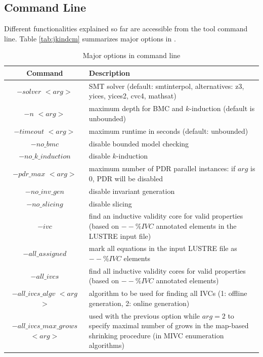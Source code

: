 \subsection{Command Line}
Different \jkind functionalities explained so far are accessible from the tool command line. Table \ref{tab:jkindcm} summarizes major options in \jkind.

\begin{table}
  \caption{Major options in \jkind command line}
   \vspace{-0.1in}
  \centering
\begin{tabularx}{\linewidth}{|c|L|}
\hline
    Command & Description\\
  \hline\hline
  $-solver $ $<$$arg$$>$ & SMT solver (default: smtinterpol, alternatives: z3, yices, yices2, cvc4, mathsat)\\[0.5ex]\hline
  $-n $ $<$$arg$$>$  & maximum depth for BMC and $k$-induction (default is unbounded) \\[0.5ex]
  $-timeout $ $<$$arg$$>$ & maximum runtime in seconds (default: unbounded)\\[0.5ex]\hline
  $-no\_bmc$ & disable bounded model checking \\[0.5ex]
  $-no\_k\_induction $ &  disable $k$-induction \\[0.5ex]
  $-pdr\_max$ $<$$arg$$>$ & maximum number of PDR parallel instances: if $arg$ is 0, PDR will be disabled \\[0.5ex]
  $-no\_inv\_gen $ & disable invariant generation \\[0.5ex]
  $-no\_slicing $ & disable slicing \\[0.5ex]\hline
  $-ivc$ & find an inductive validity core for valid properties (based on $--\%IVC$ annotated  elements in the LUSTRE input file) \\[0.5ex]
  $-all\_assigned$ & mark all equations in the input LUSTRE file as $--\%IVC$ elements \\
  $-all\_ivcs$ & find all inductive validity cores for valid  properties (based on $--\%IVC$ annotated elements) \\[0.5ex]
  $-all\_ivcs\_algv$ $<$$arg$$>$ & algorithm to be used for finding all IVCs (1: offline generation, 2: online generation) \\[0.5ex]
  $-all\_ivcs\_max\_grows$ $<$$arg$$>$ & used with the previous option while $arg = 2$ to specify maximal number of grows in the map-based  shrinking procedure (in MIVC enumeration algorithms) \\[0.5ex]

\end{tabularx}
\end{table}
